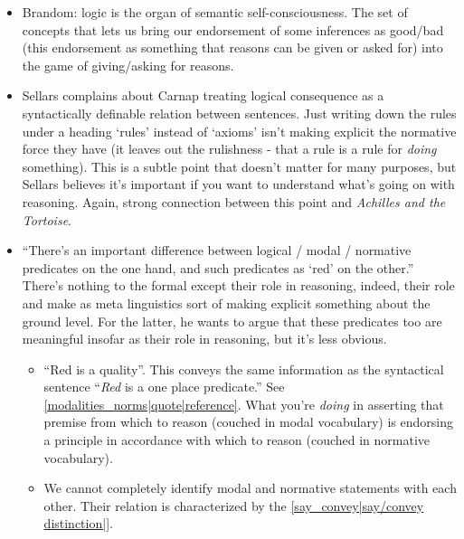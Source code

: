 \begin{itemize}
\begin{itemize}
    \end{itemize}
    \item Brandom: logic is the organ of semantic self-consciousness. The set of concepts that lets us bring our endorsement of some inferences as good/bad (this endorsement as something that reasons can be given or asked for) into the game of giving/asking for reasons.
    \item Sellars complains about Carnap treating logical consequence as a syntactically definable relation between sentences. Just writing down the rules under a heading `rules' instead of `axioms' isn't making explicit the normative force they have (it leaves out the rulishness - that a rule is a rule for \emph{doing} something). This is a subtle point that doesn't matter for many purposes, but Sellars believes it's important if you want to understand what's going on with reasoning. Again, strong connection between this point and \emph{Achilles and the Tortoise}.
    \item ``There's an important difference between logical / modal / normative predicates on the one hand, and such predicates as `red' on the other.'' There's nothing to the formal except their role in reasoning, indeed, their role and make as meta linguistics sort of making explicit something about the ground level. For the latter, he wants to argue that these predicates too are meaningful insofar as their role in reasoning, but it's less obvious. \begin{itemize}
    \item ``Red is a quality''. This conveys the same information as the syntactical sentence ``\textit{Red} is a one place predicate.'' See \ref{modalities_norms|quote|reference}. What you're \emph{doing} in asserting that premise from which to reason (couched in modal vocabulary) is endorsing a principle in accordance with which to reason (couched in normative vocabulary).

    \item We cannot completely identify modal and normative statements with each other. Their relation is characterized by the \ref{say_convey|say/convey distinction|}.
    \end{itemize}
\end{itemize}








